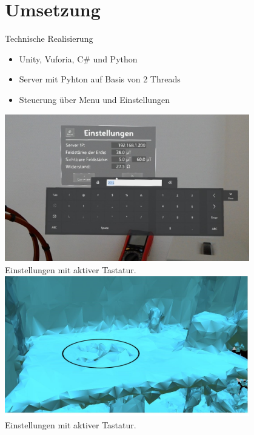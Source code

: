 \part{Umsetzung}
\begin{frame}[fragile]{Technische Realisierung}
\begin{minipage}{0.5\textwidth}
	{
		\begin{itemize}[itemsep=1mm]
			\item Unity, Vuforia, C\# und Python
			\item Server mit Pyhton auf Basis von 2 Threads
			\item Steuerung über Menu und Einstellungen
		\end{itemize}
	}
\end{minipage}
\begin{minipage}{0.45\textwidth}
	\centering
	\includegraphics[width=0.8\textwidth]{images/HL/settings_c.jpg}\\
	\scriptsize Einstellungen mit aktiver Tastatur.
	\includegraphics[width=0.8\textwidth]{images/HL/mesh.JPG}\\
	\scriptsize Einstellungen mit aktiver Tastatur.	
\end{minipage}
\end{frame}

